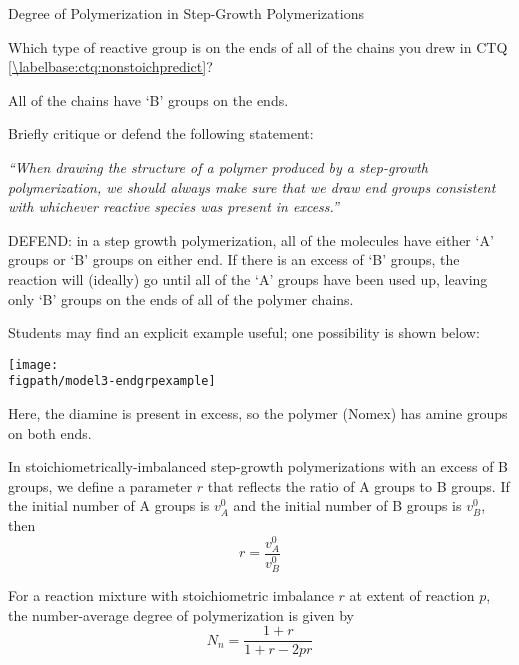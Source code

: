 \begin{activity}{Degree of Polymerization in Step-Growth Polymerizations}
\begin{ctqs}
		\question Which type of reactive group is on the ends of all of the chains you drew in CTQ \ref{\labelbase:ctq:nonstoichpredict}?
		
		\begin{solution}[0.75in]{}
			All of the chains have `B' groups on the ends.
		\end{solution}
		
		\question Briefly critique or defend the following statement:
		
			\emph{``When drawing the structure of a polymer produced by a step-growth polymerization, we should always make sure that we draw end groups consistent with whichever reactive species was present in excess.''}
		
		\begin{solution}[1.85in]{}
		DEFEND: in a step growth polymerization, all of the molecules have either `A' groups or `B' groups on either end.  If there is an excess of `B' groups, the reaction will (ideally) go until all of the `A' groups have been used up, leaving only `B' groups on the ends of all of the polymer chains.
			
			Students may find an explicit example useful; one possibility is shown below:
			
			\centerline{\texttt{[image: \\figpath/model3-endgrpexample]}}			
			
			Here, the diamine is present in excess, so the polymer (Nomex) has amine groups on both ends.
		\end{solution}
			
\end{ctqs}
	
\begin{infobox}

In stoichiometrically-imbalanced step-growth polymerizations with an excess of B groups, we define a parameter $r$ that reflects the ratio of A groups to B groups.	
	If the initial number of A groups is $v_A^0$ and the initial number of B groups is $v_B^0$, then
	\begin{equation*}
		r = \frac{v_A^0}{v_B^0}
	\end{equation*}
	
	
	For a reaction mixture with stoichiometric imbalance $r$ at extent of reaction $p$, the number-average degree of polymerization is given by
	\begin{equation*}
		N_n = \frac{1+r}{1+r-2pr}
	\end{equation*}
	
\end{infobox}
	

\end{activity}
